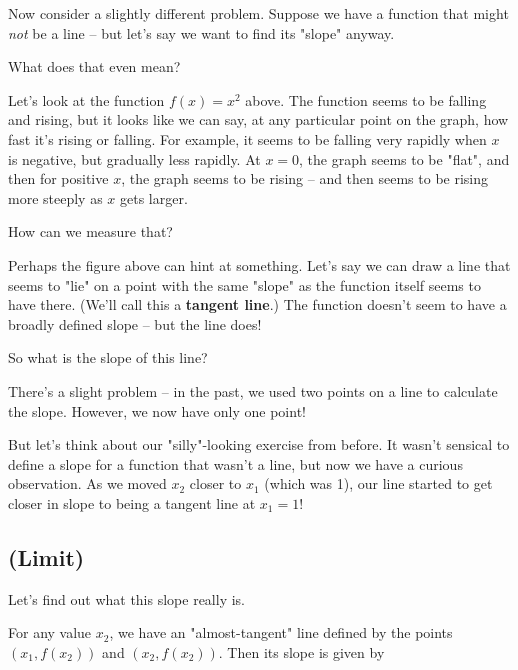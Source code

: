 Now consider a slightly different problem. Suppose we have a function that might \textit{not} be a line -- but let's say we want to find its "slope" anyway.

\vspace{2in}

What does that even mean? 

Let's look at the function $f(x) = x^2$ above. The function seems to be falling and rising, but it looks like we can say, at any particular point on the graph, how fast it's rising or falling. For example, it seems to be falling very rapidly when $x$ is negative, but gradually less rapidly. At $x = 0$, the graph seems to be "flat", and then for positive $x$, the graph seems to be rising -- and then seems to be rising more steeply as $x$ gets larger.

How can we measure that?

\vspace{2in}

Perhaps the figure above can hint at something. Let's say we can draw a line that seems to "lie" on a point with the same "slope" as the function itself seems to have there. (We'll call this a \textbf{tangent line}.) The function doesn't seem to have a broadly defined slope -- but the line does!

So what is the slope of this line?

There's a slight problem -- in the past, we used two points on a line to calculate the slope. However, we now have only one point!

\vspace{2in}

But let's think about our "silly"-looking exercise from before. It wasn't sensical to define a slope for a function that wasn't a line, but now we have a curious observation. As we moved $x_2$ closer to $x_1$ (which was 1), our line started to get closer in slope to being a tangent line at $x_1 = 1$!

\subsection{(Limit)}

Let's find out what this slope really is.

For any value $x_2$, we have an "almost-tangent" line defined by the points $(x_1, f(x_2))$ and $(x_2, f(x_2))$. Then its slope is given by

